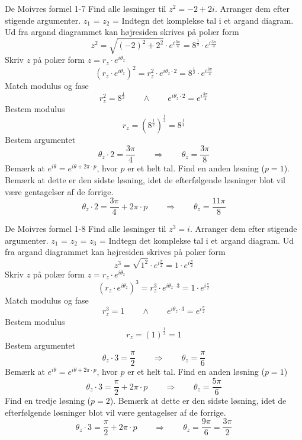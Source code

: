 \documentclass{article}
\begin{document}
\newpage
\begin{exercise}{De Moivres formel 1-7}
Find alle løsninger til $z^2 = - 2 + 2i$.
Arranger dem efter stigende argumenter.
$z_1$ = 
$z_2$ = 
\hint
Indtegn det komplekse tal i et argand diagram.
\hint
Ud fra argand diagrammet kan højresiden skrives på polær form
\[z^2 = \sqrt{(-2)^2 + 2^2} \cdot e^{i \frac{3 \pi}{4}} = 8^{\frac{1}{2}} \cdot e^{i \frac{3 \pi}{4}}
\]
\hint
Skriv $z$ på polær form $z = r_z \cdot e^{i \theta_z}$
\[\left(r_z \cdot e^{i \theta_z}\right)^2 = r_z^2 \cdot e^{i \theta_z \cdot 2} = 8^{\frac{1}{2}} \cdot e^{i \frac{3 \pi}{4}}
\]
\hint
Match modulus og fase
\[r_z^2 = 8^{\frac{1}{2}} \qquad \wedge \qquad e^{i \theta_z \cdot 2} = e^{i \frac{3 \pi}{4}}
\]
\hint
Bestem modulus
\[r_z = \left(8^{\frac{1}{2}} \right)^{\frac{1}{2}} = 8^{\frac{1}{4}}
\]
\hint
Bestem argumentet
\[\theta_z \cdot 2 = \frac{3 \pi}{4} \qquad \Rightarrow \qquad \theta_z = \frac{3\pi}{8}
\]
\hint
Bemærk at $e^{i \theta} = e^{i \theta + 2 \pi \cdot p}$, hvor $p$ er et helt tal.
\hint
Find en anden løsning ($p = 1$).
Bemærk at dette er den sidste løsning, idet de efterfølgende
løsninger blot vil være gentagelser af de forrige.
\[\theta_z \cdot 2 = \frac{3 \pi}{4} + 2 \pi \cdot p \qquad \Rightarrow \qquad \theta_z = \frac{11 \pi}{8}
\]
\end{exercise}
\newpage
\begin{exercise}{De Moivres formel 1-8}
Find alle løsninger til $z^3 = i$.
Arranger dem efter stigende argumenter.
$z_1$ = 
$z_2$ = 
$z_3$ = 
\hint
Indtegn det komplekse tal i et argand diagram.
\hint
Ud fra argand diagrammet kan højresiden skrives på polær form
\[z^3 = \sqrt{1^2} \cdot e^{i \frac{\pi}{2}} = 1 \cdot e^{i \frac{\pi}{2}}
\]
\hint
Skriv $z$ på polær form $z = r_z \cdot e^{i \theta_z}$
\[\left(r_z \cdot e^{i \theta_z}\right)^3 = r_z^3 \cdot e^{i \theta_z \cdot 3} = 1 \cdot e^{i \frac{\pi}{2}}
\]
\hint
Match modulus og fase
\[r_z^3 = 1 \qquad \wedge \qquad e^{i \theta_z \cdot 3} = e^{i \frac{\pi}{2}}
\]
\hint
Bestem modulus
\[r_z = \left(1 \right)^{\frac{1}{3}} = 1
\]
\hint
Bestem argumentet
\[\theta_z \cdot 3 = \frac{\pi}{2} \qquad \Rightarrow \qquad \theta_z = \frac{\pi}{6}
\]
\hint
Bemærk at $e^{i \theta} = e^{i \theta + 2 \pi \cdot p}$, hvor $p$ er et helt tal.
\hint
Find en anden løsning ($p = 1$)
\[\theta_z \cdot 3 = \frac{\pi}{2} + 2 \pi \cdot p \qquad \Rightarrow \qquad \theta_z = \frac{5 \pi}{6}
\]
\hint
Find en tredje løsning ($p = 2$).
Bemærk at dette er den sidste løsning, idet de efterfølgende
løsninger blot vil være gentagelser af de forrige.
\[\theta_z \cdot 3 = \frac{\pi}{2} + 2 \pi \cdot p \qquad \Rightarrow \qquad \theta_z = \frac{9 \pi}{6} = \frac{3 \pi}{2}
\]
\end{exercise}
\end{document}
